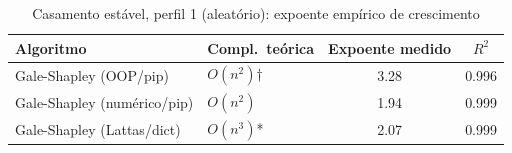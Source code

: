 \begin{table}[H]
    \centering
    \caption{Casamento estável, perfil 1 (aleatório): expoente empírico de crescimento}
    \label{tab:exp-stable-marriage}
    \renewcommand{\arraystretch}{1.25}
    \footnotesize
    \begin{tabularx}{\textwidth}{@{} X l c c @{}}
        \toprule
        \textbf{Algoritmo} & \textbf{Compl.\ teórica} & \textbf{Expoente medido} & \textbf{$R^2$} \\
        \midrule
        Gale-Shapley (OOP/pip) & $O(n^{2})$† & 3.28 & 0.996 \\
        Gale-Shapley (numérico/pip) & $O(n^{2})$ & 1.94 & 0.999 \\
        Gale-Shapley (Lattas/dict) & $O(n^{3})$* & 2.07 & 0.999 \\
        \bottomrule
    \end{tabularx}
\end{table}
